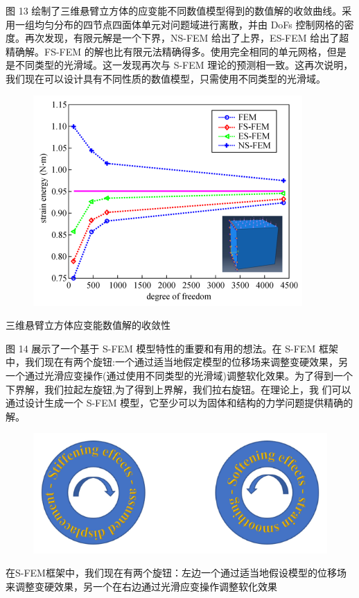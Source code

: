 \documentclass[12pt,a4paper]{article}
\begin{document}
图 13 绘制了三维悬臂立方体的应变能不同数值模型得到的数值解的收敛曲线。采用一组均匀分布的四节点四面体单元对问题域进行离散，并由 DoFs 控制网格的密度。再次发现，有限元解是一个下界，NS-FEM 给出了上界，ES-FEM 给出了超精确解。FS-FEM 的解也比有限元法精确得多。使用完全相同的单元网格，但是是不同类型的光滑域。这一发现再次与 S-FEM 理论的预测相一致。这再次说明，我们现在可以设计具有不同性质的数值模型，只需使用不同类型的光滑域。

\begin{figure}[H]
\centering
\includegraphics[scale=0.6]{./figures/17.png}
\caption{}
\end{figure}
三维悬臂立方体应变能数值解的收敛性

图 14 展示了一个基于 S-FEM 模型特性的重要和有用的想法。在 S-FEM 框架中，我们现在有两个旋钮:一个通过适当地假定模型的位移场来调整变硬效果，另一个通过光滑应变操作(通过使用不同类型的光滑域)调整软化效果。为了得到一个下界解，我们拉起左旋钮,为了得到上界解，我们拉右旋钮。在理论上，我
们可以通过设计生成一个 S-FEM 模型，它至少可以为固体和结构的力学问题提供精确的解。

\begin{figure}[H]
\centering
\includegraphics[scale=0.6]{./figures/18.png}
\caption{}
\end{figure}
在S-FEM框架中，我们现在有两个旋钮：左边一个通过适当地假设模型的位移场来调整变硬效果，另一个在右边通过光滑应变操作调整软化效果
\end{document}

